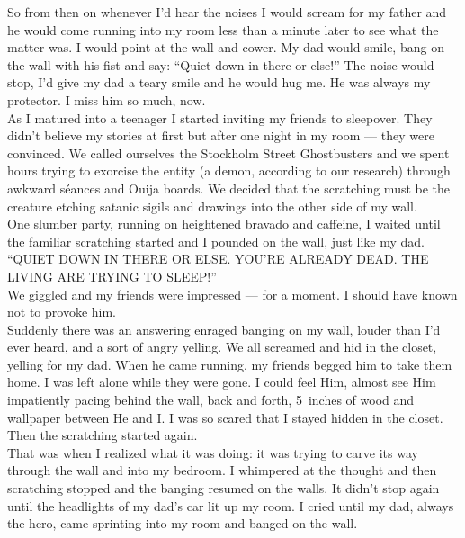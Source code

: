\documentclass[a5paper]{scrartcl}
\begin{document}
So from then on whenever I'd hear the noises I would scream for my father and he would come running into my room less than a minute later to see what the matter was. I would point at the wall and cower. My dad would smile, bang on the wall with his fist and say: \enquote{Quiet down in there or else!} The noise would stop, I'd give my dad a teary smile and he would hug me. He was always my protector. I miss him so much, now.\\


As I matured into a teenager I started inviting my friends to sleepover. They didn't believe my stories at first but after one night in my room --- they were convinced. We called ourselves the Stockholm Street Ghostbusters and we spent hours trying to exorcise the entity (a demon, according to our research) through awkward séances and Ouija boards. We decided that the scratching must be the creature etching satanic sigils and drawings into the other side of my wall.\\


One slumber party, running on heightened bravado and caffeine, I waited until the familiar scratching started and I pounded on the wall, just like my dad. \\


\enquote{QUIET DOWN IN THERE OR ELSE. YOU'RE ALREADY DEAD. THE LIVING ARE TRYING TO SLEEP!} \\


We giggled and my friends were impressed --- for a moment. I should have known not to provoke him. \\


Suddenly there was an answering enraged banging on my wall, louder than I'd ever heard, and a sort of angry yelling. We all screamed and hid in the closet, yelling for my dad. When he came running, my friends begged him to take them home. I was left alone while they were gone. I could feel Him, almost see Him impatiently pacing behind the wall, back and forth, 5~inches of wood and wallpaper between He and I. I was so scared that I stayed hidden in the closet. Then the scratching started again.\\


That was when I realized what it was doing: it was trying to carve its way through the wall and into my bedroom. I whimpered at the thought and then scratching stopped and the banging resumed on the walls. It didn't stop again until the headlights of my dad's car lit up my room. I cried until my dad, always the hero, came sprinting into my room and banged on the wall. \\
\end{document}
